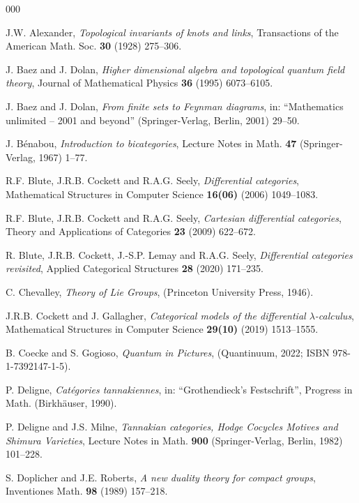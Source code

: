 \documentclass[a4paper,12pt]{article}
\theoremstyle{step}
\begin{document}
\newpage
\appendix
\begin{thebibliography}{000}

 J.W. Alexander, 
\textit{Topological invariants of knots and links}, 
Transactions of the American Math. Soc. \textbf{30} (1928) 275--306.

 J. Baez and J. Dolan, 
\textit{Higher dimensional algebra and topological quantum field theory}, 
Journal of Mathematical Physics \textbf{36} (1995) 6073--6105.

 J. Baez and J. Dolan, 
\textit{From finite sets to Feynman diagrams}, 
in: ``Mathematics unlimited -- 2001 and beyond''
(Springer-Verlag, Berlin, 2001) 29--50.

 J. B\'enabou, \textit{Introduction to bicategories}, 
Lecture Notes in Math. \textbf{47} (Springer-Verlag, 1967) 1--77.

 R.F. Blute, J.R.B. Cockett and R.A.G. Seely, 
\textit{Differential categories}, 
Mathematical Structures in Computer Science \textbf{16(06)} (2006) 1049--1083.

 R.F. Blute, J.R.B. Cockett and R.A.G. Seely, 
\textit{Cartesian differential categories}, 
Theory and Applications of Categories \textbf{23} (2009) 622--672.

R. Blute, J.R.B. Cockett, J.-S.P. Lemay and R.A.G. Seely, \textit{Differential categories revisited}, 
Applied Categorical Structures  \textbf{28} (2020) 171--235. 

 C. Chevalley, 
\textit{Theory of Lie Groups}, (Princeton University Press, 1946).

 J.R.B. Cockett and J. Gallagher, 
\textit{Categorical models of the differential $\lambda$-calculus}, 
Mathematical Structures in Computer Science \textbf{29(10)} (2019) 1513--1555.

 B. Coecke and S. Gogioso, 
\textit{Quantum in Pictures}, 
(Quantinuum, 2022; ISBN 978-1-7392147-1-5).

 P. Deligne, \textit{Cat\'egories tannakiennes}, 
in: ``Grothendieck's Festschrift'', Progress in Math. (Birkh\"auser, 1990).

 P. Deligne and J.S. Milne, 
 \textit{Tannakian categories, Hodge Cocycles Motives and Shimura Varieties},
Lecture Notes in Math. \textbf{900} (Springer-Verlag, Berlin, 1982) 101--228.

 S. Doplicher and J.E. Roberts, 
\textit{A new duality theory for compact groups}, Inventiones Math. \textbf{98} (1989)
157--218.


\end{thebibliography}
\end{document}
